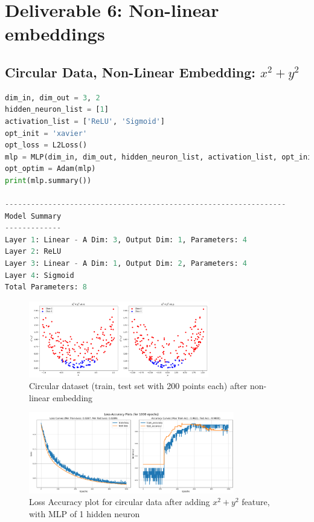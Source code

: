 
\section{Deliverable 6: Non-linear embeddings}


\subsection{Circular Data, Non-Linear Embedding: $x^2 + y^2$}

\begin{solve}    
\begin{lstlisting}[language=python, title = MLP used for linearly separable data after adding non linear feature]
dim_in, dim_out = 3, 2
hidden_neuron_list = [1]
activation_list = ['ReLU', 'Sigmoid']
opt_init = 'xavier'
opt_loss = L2Loss()
mlp = MLP(dim_in, dim_out, hidden_neuron_list, activation_list, opt_init)
opt_optim = Adam(mlp)
print(mlp.summary())
    
-----------------------------------------------------------------
Model Summary
-------------
Layer 1: Linear - A Dim: 3, Output Dim: 1, Parameters: 4
Layer 2: ReLU
Layer 3: Linear - A Dim: 1, Output Dim: 2, Parameters: 4
Layer 4: Sigmoid
Total Parameters: 8
\end{lstlisting}
    
\begin{figure}
    \centering
    \includegraphics[width=0.7\textwidth]{plots/7_circle_transformation.png}
    \caption{Circular dataset (train, test set with 200 points each) after non-linear embedding}
\end{figure}


\begin{figure}[H]
    \centering
    \includegraphics[width=0.8\textwidth]{plots/7_circle_loss_acc.png}
    \caption{Loss Accuracy plot for circular data after adding $x^2 + y^2$ feature, with MLP of 1 hidden neuron}


\end{figure}
\end{solve}

